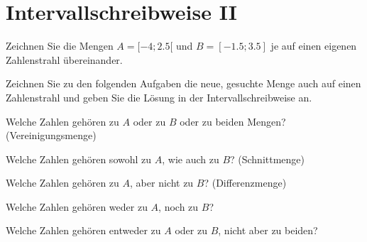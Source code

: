 \platzFuerBerechnungenBisEndeSeite{}




\section{Intervallschreibweise II}
Zeichnen Sie die Mengen $A = [-4 ; 2.5[$ und $B = [-1.5; 3.5]$
je auf einen eigenen Zahlenstrahl übereinander.

Zeichnen Sie zu den folgenden Aufgaben die neue, gesuchte Menge auch auf
einen Zahlenstrahl und geben Sie die Lösung in der Intervallschreibweise an.


\begin{bbwAufgabenBlock}
\item Welche Zahlen gehören zu $A$ oder zu $B$ oder zu beiden Mengen?
(Vereinigungsmenge) 

\item Welche Zahlen gehören sowohl zu $A$, wie auch zu $B$?
(Schnittmenge) \LoesungsRaumLang{$A\cap B = [-1.5; 2.5[$}

\item Welche Zahlen gehören zu $A$, aber nicht zu $B$?
(Differenzmenge) \LoesungsRaumLang{$A\backslash B = [-4;-1.5[$}

\item Welche Zahlen gehören weder zu $A$, noch zu
$B$? \LoesungsRaumLang{$]-\infty; -4[ \cup ]3.5;\infty[$}

\item Welche Zahlen gehören entweder zu $A$ oder zu $B$, nicht aber zu
beiden? \LoesungsRaumLang{$[-4;-1.5[ \cup [2.5;3.5]$}

\end{bbwAufgabenBlock}


\platzFuerBerechnungenBisEndeSeite{}



